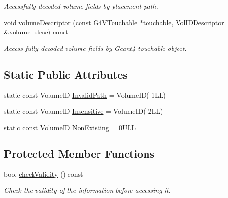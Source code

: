 \begin{DoxyCompactItemize}
\begin{DoxyCompactList}\small\item\em Accessfully decoded volume fields by placement path. \end{DoxyCompactList}\item 
void \hyperlink{class_d_d4hep_1_1_simulation_1_1_geant4_volume_manager_ab88934cb43f8caffd4549d814aa91450}{volume\+Descriptor} (const G4\+V\+Touchable $\ast$touchable, \hyperlink{class_d_d4hep_1_1_simulation_1_1_geant4_volume_manager_aeedd11a516f671331ec2a46f5d39768d}{Vol\+I\+D\+Descriptor} \&volume\+\_\+desc) const
\begin{DoxyCompactList}\small\item\em Access fully decoded volume fields by Geant4 touchable object. \end{DoxyCompactList}\end{DoxyCompactItemize}
\subsection*{Static Public Attributes}
\begin{DoxyCompactItemize}
\item 
static const Volume\+ID \hyperlink{class_d_d4hep_1_1_simulation_1_1_geant4_volume_manager_a7a52a387bf1165cc296e76eeda618e9c}{Invalid\+Path} = Volume\+ID(-\/1\+L\+L)
\item 
static const Volume\+ID \hyperlink{class_d_d4hep_1_1_simulation_1_1_geant4_volume_manager_a3cd1e1946cee2db0e8a5a8240c9095be}{Insensitive} = Volume\+ID(-\/2\+L\+L)
\item 
static const Volume\+ID \hyperlink{class_d_d4hep_1_1_simulation_1_1_geant4_volume_manager_a21aa25818681febe8658db66aa94b89c}{Non\+Existing} = 0\+U\+LL
\end{DoxyCompactItemize}
\subsection*{Protected Member Functions}
\begin{DoxyCompactItemize}
\item 
bool \hyperlink{class_d_d4hep_1_1_simulation_1_1_geant4_volume_manager_af20e15293550cbd6b35f362660ceeb5e}{check\+Validity} () const
\begin{DoxyCompactList}\small\item\em Check the validity of the information before accessing it. \end{DoxyCompactList}\end{DoxyCompactItemize}
